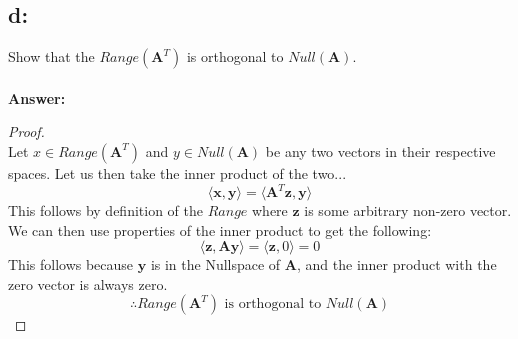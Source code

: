 \documentclass[]{article}
\begin{document}
	\subsection*{d:}
	Show that the $Range(\mathbf{A}^T)$ is orthogonal to $Null(\mathbf{A})$.
	\\~\\
	\textbf{Answer:}
	\begin{proof}~\\
		Let $x\in Range(\mathbf{A}^T)$ and $y\in Null(\mathbf{A})$ be any two vectors in their respective spaces. Let us then take the inner product of the two...
		\[\langle \mathbf{x},\mathbf{y} \rangle = \langle \mathbf{A}^T\mathbf{z}, \mathbf{y} \rangle\]
		This follows by definition of the $Range$ where $\mathbf{z}$ is some arbitrary non-zero vector. We can then use properties of the inner product to get the following:
		\[\langle \mathbf{z}, \mathbf{A}\mathbf{y} \rangle = \langle \mathbf{z}, 0 \rangle = 0\]
		This follows because $\mathbf{y}$ is in the Nullspace of $\mathbf{A}$, and the inner product with the zero vector is always zero.
		\[\therefore Range(\mathbf{A}^T) \text{ is orthogonal to }Null(\mathbf{A})\]
	\end{proof}
		
\end{document}
